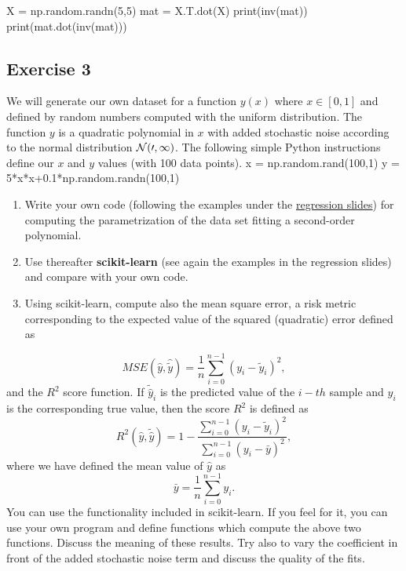\documentclass[%
oneside,                 %
final,                   %
10pt]{article}
\begin{document}
X = np.random.randn(5,5)
mat = X.T.dot(X)
print(inv(mat))
print(mat.dot(inv(mat)))
\epycod
\subsection{Exercise 3}

We will generate our own dataset for a function $y(x)$ where $x \in [0,1]$ and defined by random numbers computed with the uniform distribution. The function $y$ is a quadratic polynomial in $x$ with added stochastic noise according to the normal distribution $\cal {N}(0,1)$.
The following simple Python instructions define our $x$ and $y$ values (with 100 data points).
\bpycod
x = np.random.rand(100,1)
y = 5*x*x+0.1*np.random.randn(100,1)
\epycod

\begin{enumerate}
\item Write your own code (following the examples under the \href{{https://compphysics.github.io/MachineLearning/doc/pub/Regression/html/Regression-bs.html}}{regression slides}) for computing the parametrization of the data set fitting a second-order polynomial. 

\item Use thereafter \textbf{scikit-learn} (see again the examples in the regression slides) and compare with your own code.   

\item Using scikit-learn, compute also the mean square error, a risk metric corresponding to the expected value of the squared (quadratic) error defined as
\end{enumerate}

\noindent
\[ MSE(\hat{y},\hat{\tilde{y}}) = \frac{1}{n}
\sum_{i=0}^{n-1}(y_i-\tilde{y}_i)^2, 
\] 
and the $R^2$ score function.
If $\tilde{\hat{y}}_i$ is the predicted value of the $i-th$ sample and $y_i$ is the corresponding true value, then the score $R^2$ is defined as
\[
R^2(\hat{y}, \tilde{\hat{y}}) = 1 - \frac{\sum_{i=0}^{n - 1} (y_i - \tilde{y}_i)^2}{\sum_{i=0}^{n - 1} (y_i - \bar{y})^2},
\]
where we have defined the mean value  of $\hat{y}$ as
\[
\bar{y} =  \frac{1}{n} \sum_{i=0}^{n - 1} y_i.
\]
You can use the functionality included in scikit-learn. If you feel for it, you can use your own program and define functions which compute the above two functions. 
Discuss the meaning of these results. Try also to vary the coefficient in front of the added stochastic noise term and discuss the quality of the fits.
\end{document}
